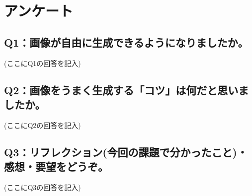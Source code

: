 \documentclass[12pt,a4j]{jarticle}
\begin{document}
\section{アンケート}

\subsection{Q1：画像が自由に生成できるようになりましたか。}

(ここにQ1の回答を記入)

\subsection{Q2：画像をうまく生成する「コツ」は何だと思いましたか。}

(ここにQ2の回答を記入)

\subsection{Q3：リフレクション(今回の課題で分かったこと)・感想・要望をどうぞ。}

(ここにQ3の回答を記入)
\end{document}
